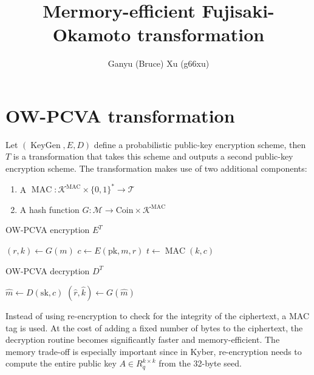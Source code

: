 \documentclass{article}
\title{Mermory-efficient Fujisaki-Okamoto transformation}
\author{Ganyu (Bruce) Xu (g66xu)}
\newcommand{\keygen}{\operatorname{KeyGen}}
\begin{document}
\maketitle

\section{OW-PCVA transformation}
Let $(\keygen, E, D)$ define a probabilistic public-key encryption scheme, then $T$ is a transformation that takes this scheme and outputs a second public-key encryption scheme. The transformation makes use of two additional components:

\begin{enumerate}
    \item A $\operatorname{MAC}: \mathcal{K}^\text{MAC} \times \{0,1\}^\ast \rightarrow \mathcal{T}$
    \item A hash function $G: \mathcal{M} \rightarrow \text{Coin} \times \mathcal{K}^\text{MAC}$
\end{enumerate}

\begin{multicols}{2}
    \begin{algorithm}[H]
        \SetAlgoLined
        \caption{OW-PCVA encryption $E^T$}
        $(r, k) \leftarrow G(m)$\;
        $c \leftarrow E(\text{pk}, m, r)$\;
        $t \leftarrow \operatorname{MAC}(k, c)$
        \;
        \;
    \end{algorithm}

    \columnbreak

    \begin{algorithm}[H]
        \SetAlgoLined
        \caption{OW-PCVA decryption $D^T$}
        $\hat{m} \leftarrow D(\text{sk}, c)$\;
        $(\hat{r}, \hat{k}) \leftarrow G(\hat{m})$\;
        \;
    \end{algorithm}
\end{multicols}

Instead of using re-encryption to check for the integrity of the ciphertext, a MAC tag is used. At the cost of adding a fixed number of bytes to the ciphertext, the decryption routine becomes significantly faster and memory-efficient. The memory trade-off is especially important since in Kyber, re-encryption needs to compute the entire public key $A \in R_q^{k \times k}$ from the 32-byte seed.
\end{document}
